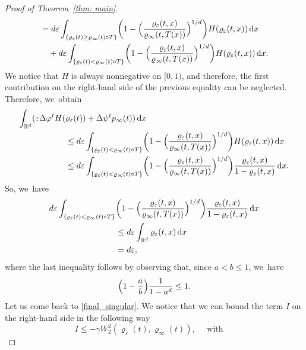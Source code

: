 \documentclass[10pt]{amsart}
\newcommand{\Bprt}[1]{\Bigl(#1\Bigr)}
\newcommand{\bbprt}[1]{\biggl(#1\biggr)}
\newcommand{\dx}[1]{\mathop{}\!\mathrm{d} #1}
\newcommand{\R}{\mathbb{R}}
\theoremstyle{plain}
\theoremstyle{remark}
\begin{document}
\begin{proof}[Proof of Theorem~\ref{thm: main}]
\begin{equation*}
\begin{split}
&= {d \varepsilon \int_{\{\varrho_\varepsilon(t) \geq \varrho_\infty(t)\circ T\}} \bbprt{1-\Bprt{\frac{\varrho_\varepsilon(t,x)}{\varrho_\infty(t,T(x))}}^{1/d}} H(\varrho_\varepsilon(t,x)) \dx x}\\
&\quad
+ {d \varepsilon \int_{\{\varrho_\varepsilon(t) < \varrho_\infty(t)\circ T\}} \bbprt{1-\Bprt{\frac{\varrho_\varepsilon(t,x)}{\varrho_\infty(t,T(x))}}^{1/d}} H(\varrho_\varepsilon(t,x)) \dx x}.
\end{split}
\end{equation*}
We notice that $H$ is always nonnegative on $[0,1)$, and therefore, the first contribution on the right-hand side of the previous equality can be neglected. Therefore, we~obtain
\begin{equation*}
\begin{split}
\int_{\R^d} (\varepsilon \Delta \varphi^t H(&\varrho_\varepsilon(t)) +\Delta \psi^t p_\infty(t) )\dx x
\\
&\le {d \varepsilon \int_{\{\varrho_\varepsilon(t) < \varrho_\infty(t)\circ T\}} \bbprt{1-\Bprt{\frac{\varrho_\varepsilon(t,x)}{\varrho_\infty(t,T(x))}}^{1/d}} H(\varrho_\varepsilon(t,x)) \dx x}\\
&\leq d \varepsilon \int_{{\{\varrho_\varepsilon(t) < \varrho_\infty(t)\circ T\}}} \bbprt{1-\Bprt{\frac{\varrho_\varepsilon(t,x)}{\varrho_\infty(t,T(x))}}^{1/d}} \frac{\varrho_\varepsilon(t,x)}{1-\varrho_\varepsilon(t,x)} \dx x.
\end{split}
\end{equation*}
So, we~have
\begin{equation}
\label{singular terms}
\begin{split}
d \varepsilon \int_{{\{\varrho_\varepsilon(t) < \varrho_\infty(t)\circ T\}}} & \bbprt{1-\Bprt{\frac{\varrho_\varepsilon(t,x)}{\varrho_\infty(t,T(x))}}^{1/d}} \frac{\varrho_\varepsilon(t,x)}{1-\varrho_\varepsilon(t,x)} \dx x\\
&\le d \varepsilon \int_{\R^d} \varrho_\varepsilon(t,x) \dx x\\
&= d \varepsilon,
\end{split}
\end{equation}
where the last inequality follows by observing that, since $a<b\leq 1$, we~have
\[
\Bigl(1-\frac ab\Bigr)\frac{1}{1-a^d}\leq 1.
\]
Let us come back to \eqref{final_singular}.
We notice that we can bound the term $I$ on the right-hand side in the following way
\begin{equation*}
I\leq -\gamma W_2^2(\varrho_\varepsilon(t),\varrho_\infty(t)), \quad
\text{ with } \quad

\end{equation*}
\end{proof}
\end{document}
